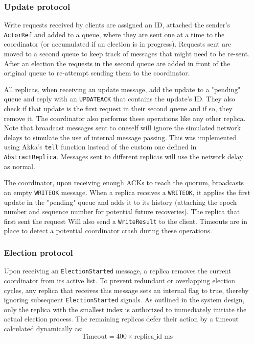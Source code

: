 \subsubsection{Update protocol}
Write requests received by clients are assigned an ID, attached the sender's \texttt{ActorRef} and added to a queue, where they are sent one
at a time to the coordinator (or accumulated if an election is in progress). Requests sent are moved to a second queue to keep track of
messages that might need to be re-sent. After an election the requests in the second queue are added in front of the original queue to re-attempt sending them to the coordinator.

All replicas, when receiving an update message, add the update to a "pending" queue and reply with an \texttt{UPDATEACK} that contains the
update's ID. They also check if that update is the first request in their second queue and if so, they remove it.
The coordinator also performs these operations like any other replica.
Note that broadcast messages sent to oneself will ignore the simulated network delays to simulate the use of internal message passing.
This was implemented using Akka's \texttt{tell} function instead of the custom one defined in \texttt{AbstractReplica}.
Messages sent to different replicas will use the network delay as normal.

The coordinator, upon receiving enough ACKs to reach the quorum, broadcasts an empty \texttt{WRITEOK} message. When a replica receives a 
\texttt{WRITEOK}, it applies the first update in the "pending" queue and adds it to its history (attaching the epoch number and sequence
number for potential future recoveries). The replica that first sent the request Will also send a \texttt{WriteResult} to the client.
Timeouts are in place to detect a potential coordinator crash during these operations.

\subsubsection{Election protocol}
Upon receiving an \texttt{ElectionStarted} message, a replica removes the current coordinator from its active list. To prevent redundant or overlapping election cycles, any replica that receives this message sets an internal flag to true, thereby ignoring subsequent \texttt{ElectionStarted} signals.
As outlined in the system design, only the replica with the smallest index is authorized to immediately initiate the actual election process. The remaining replicas defer their action by a timeout calculated dynamically as:
\begin{equation}
\text{Timeout} = 400 \times \text{replica\_id} \text{ ms}
\end{equation}

